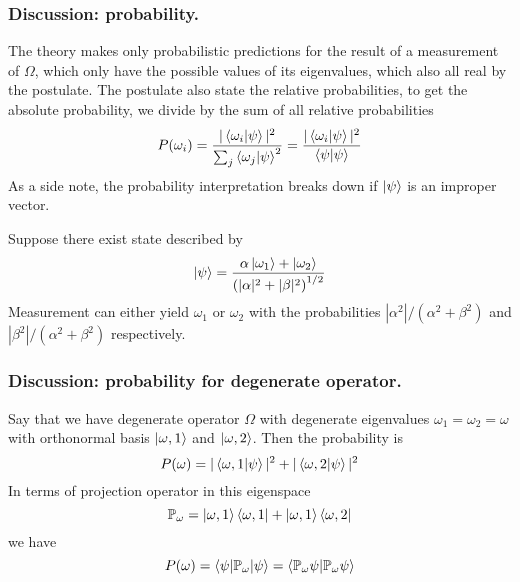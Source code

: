 \documentclass[../../../main.tex]{subfiles}
\begin{document}
\subsubsection{Discussion: probability.}
The theory makes only probabilistic predictions for the result of a measurement of $\Omega$, which only have the possible values of its eigenvalues, which also all real by the postulate.
The postulate also state the relative probabilities, to get the absolute probability, we divide by the sum of all relative probabilities
\begin{equation*}
    P(\omega_i)=\frac{|\braket{\omega_i|\psi}|^2 }{\sum_j \braket{\omega_j | \psi}^2}=\frac{|\braket{\omega_i|\psi}|^2}{\braket{\psi|\psi}}
\end{equation*}
As a side note, the probability interpretation breaks down if $\ket{\psi}$ is an improper vector.

Suppose there exist state described by
\begin{equation*}
    \ket{\psi}=\frac{\alpha \ket{\omega_1 }+\ket{\omega_2}}{\left( |\alpha|^2+|\beta|^2 \right)^{1/2} }
\end{equation*}
Measurement can either yield $\omega_1$ or $\omega_2$ with the probabilities $|\alpha^2|/(\alpha^2+\beta^2)$ and $|\beta^2|/(\alpha^2+\beta^2)$ respectively.

\subsubsection{Discussion: probability for degenerate operator.}
Say that we have degenerate operator $\Omega$ with degenerate eigenvalues $\omega_1=\omega_2=\omega$ with orthonormal basis $\ket{\omega,1}$ and $\ket{\omega,2}$. 
Then the probability is 
\begin{equation*}
    P(\omega)=|\braket{\omega,1|\psi}|^2+|\braket{\omega,2|\psi}|^2
\end{equation*}
In terms of projection operator in this eigenspace
\begin{equation*}
    \mathbb{P }_\omega=\ket{\omega,1}\bra{\omega,1}+\ket{\omega,1 }\bra{\omega,2}
\end{equation*}
we have 
\begin{equation*}
    P(\omega)=\braket{\psi|\mathbb{P}_\omega|\psi}=\braket{\mathbb{P}_\omega \psi|\mathbb{P}_\omega \psi}
\end{equation*}
\end{document}

